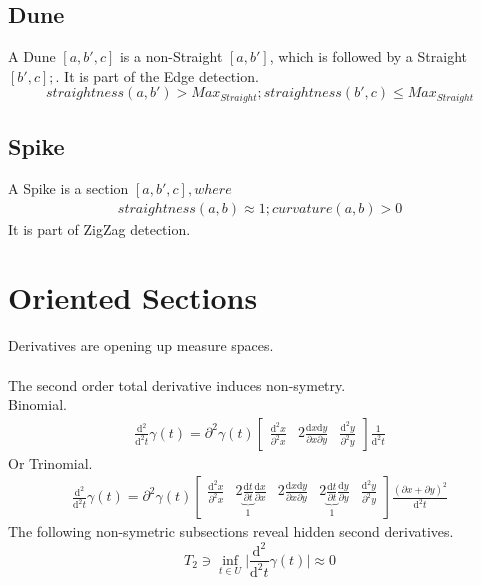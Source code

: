\documentclass{report}
\begin{document}
\subsection{Dune}
A Dune $[a,b',c]$ is a non-Straight $[a,b']$, which is followed by a Straight $[b',c]; $. It is part of the Edge detection.
\begin{equation}
straightness(a,b')>Max_{Straight};straightness(b',c)\leq Max_{Straight}
\end{equation}

\subsection{Spike}
A Spike is a section $[a,b',c], where$
\begin{align}
straightness(a,b)\approx 1; curvature(a,b)>0
\end{align}
It is part of ZigZag detection.

\section{Oriented Sections}
Derivatives are opening up measure spaces.\\\\
The second order total derivative induces non-symetry.\\
Binomial.
\begin{align}
\frac{\mathrm{d}^2}{\mathrm{d}^2t}\gamma(t)=\partial^2 \gamma(t) \begin{bmatrix} \frac{\mathrm{d}^2x}{\partial^2 x} & 2 \frac{\mathrm{d}x\mathrm{d}y}{\partial x \partial y} & \frac{\mathrm{d}^2y}{\partial^2 y}\end{bmatrix}\frac{1}{\mathrm{d}^2t}
\end{align}
Or Trinomial.
\begin{align}
\frac{\mathrm{d}^2}{\mathrm{d}^2t}\gamma(t)=\partial^2 \gamma (t) \begin{bmatrix}\frac{\mathrm{d}^2 x}{\partial^2 x} & 2 \underbrace{\frac{\mathrm{d}t}{\partial t}}_{1} \frac{\mathrm{d}x}{\partial x} & 2 \frac{\mathrm{d}x\mathrm{d}y}{\partial x \partial y} & 2 \underbrace{\frac{\mathrm{d}t}{\partial t}}_{1} \frac{\mathrm{d}y}{\partial y} & \frac{\mathrm{d}^2 y}{\partial^2 y}\end{bmatrix}\frac{(\partial x + \partial y)^2}{\mathrm{d}^2 t}
\end{align}
The following non-symetric subsections reveal hidden second derivatives.
\begin{equation}
T_{2} \ni \inf_{t \in U} \lvert \frac{\mathrm{d}^2}{\mathrm{d}^2t}\gamma(t) \rvert \approx 0
\end{equation}
\end{document}
